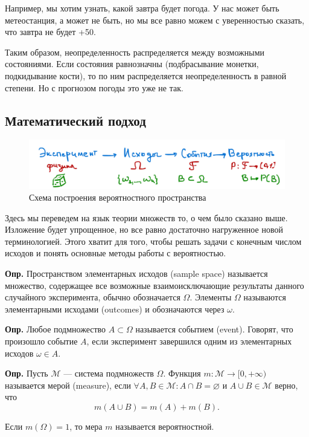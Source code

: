 \documentclass[a4paper,12pt]{article}
\newcounter{th-counter}
\newcounter{df-counter}
\newcommand{\df}{\par\noindent\textbf{Опр.} }
\begin{document}
Например, мы хотим узнать, какой завтра будет погода. У нас может быть метеостанция, а может не быть, но мы все равно можем с уверенностью сказать, что завтра не будет +50.

Таким образом, неопределенность распределяется между возможными состояниями. Если состояния равнозначны (подбрасывание монетки, подкидывание кости), то по ним распределяется неопределенность в равной степени. Но с прогнозом погоды это уже не так.

\subsection*{Математический подход}
\begin{figure}[h] %
    \centering
    \includegraphics[width=1\textwidth]{scheme_PB_theory} %
    \caption{Схема построения вероятностного пространства}
    \label{fig:my_image}
\end{figure}

Здесь мы переведем на язык теории множеств то, о чем было сказано выше. Изложение будет упрощенное, но все равно достаточно нагруженное новой терминологией. Этого хватит для того, чтобы решать задачи с конечным числом исходов и понять основные методы работы с вероятностью.

\df Пространством элементарных исходов (sample space) называется множество, содержащее все возможные взаимоисключающие результаты данного случайного эксперимента, обычно обозначается $\Omega$. Элементы $\Omega$ называются элементарными исходами (outcomes) и обозначаются через $\omega$.

\df Любое подмножество $A \subset \Omega$ называется событием (event). Говорят, что произошло событие $A$, если эксперимент завершился одним из элементарных исходов $\omega \in A$.

\df Пусть $\mathcal{M}$ --- система подмножеств $\Omega$. Функция $m : \mathcal{M} \rightarrow [0, +\infty)$ называется мерой (measure), если $\forall A, B \in \mathcal{M} : A\cap B =  \varnothing$ и $A \cup B \in \mathcal{M}$ верно, что 
$$m(A \cup B) = m(A) + m(B).$$

Если $m(\Omega) = 1$, то мера $m$ называется вероятностной.
\end{document}
